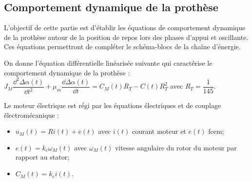 \documentclass[10pt,fleqn]{article} %
\begin{document}
\begin{multicols}{2}
%
%
%

\subsection*{Comportement dynamique de la prothèse}
\begin{obj}
L'objectif de cette partie est d'établir les équations de comportement dynamique de la prothèse autour de
la position de repos lors des phases d'appui et oscillante. Ces équations permettront de compléter le schéma-blocs
de la chaîne d'énergie.
\end{obj}

On donne l'équation différentielle linéarisée suivante qui caractérise le comportement dynamique de la prothèse :
$
J_M \dfrac{\dd^2 \Delta \alpha(t) }{\dd t^2} + \mu_m \dfrac{\dd \Delta \alpha(t) }{\dd t} = C_M(t)R_T -C(t)R_T^2$  avec  $R_T = \dfrac{1}{145}$.

Le moteur électrique est régi par les équations électriques et de couplage électromécanique :
\begin{itemize}
\item $u_M (t )=Ri (t)+e(t)$ avec $i (t )$ courant moteur et $e(t )$ fcem;
\item $e (t )=k_c \omega_M (t )$ avec $\omega_M (t )$ vitesse angulaire du rotor du moteur par rapport au stator;
\item $C_M (t )=k_c i (t )$.
\end{itemize}


%
%


\end{multicols}
\end{document}
